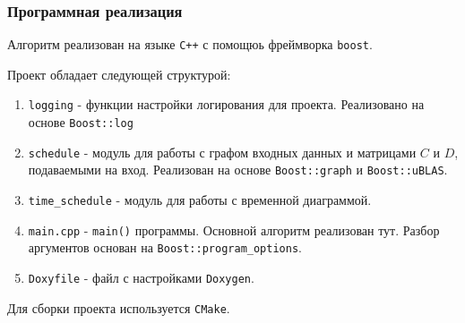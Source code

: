 \begin{frame}
    \frametitle{Программная реализация}
    Алгоритм реализован на языке \lstinline{C++} с помощюь фреймворка \lstinline{boost}.

    Проект обладает следующей структурой:
    \begin{enumerate}
        \item \lstinline{logging} - функции настройки логирования для проекта. Реализовано на основе \lstinline{Boost::log}
        \item \lstinline{schedule} - модуль для работы с графом входных данных и матрицами $C$ и $D$, подаваемыми на вход. Реализован на основе \lstinline{Boost::graph} и \lstinline{Boost::uBLAS}.
        \item \lstinline{time_schedule} - модуль для работы с временной диаграммой.
        \item \lstinline{main.cpp} - \lstinline{main()} программы. Основной алгоритм реализован тут. Разбор аргументов основан на \lstinline{Boost::program_options}.
        \item \lstinline{Doxyfile} - файл с настройками \lstinline{Doxygen}.
    \end{enumerate}

    Для сборки проекта используется \lstinline{CMake}.
\end{frame}